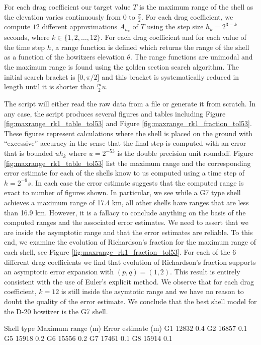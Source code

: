 \documentclass[runningheads]{llncs}
\begin{document}
For each drag coefficient our target value $T$ is the maximum range of the shell as the elevation varies continuously from $0$ to $\frac{\pi}{2}$. For each drag coefficient, we compute $12$ different approximations $A_{h_k}$ of $T$ using the step size $h_k = 2^{3-k}$ seconds, where $k \in \{1,2,\dots,12\}$.
For each drag coefficient and for each value of the time step $h$, a range function is defined which returns the range of the shell as a function of the howitzers elevation $\theta$.
The range functions are unimodal and the maximum range is found using the golden section search algorithm.
The initial search bracket is $[0,\pi/2$] and this bracket is systematically reduced in length until it is shorter than $\frac{pi}{2}u$.

The script will either read the raw data from a file or generate it from scratch. In any case, the script produces several figures and tables including Figure \ref{fig:maxrange_rk1_table_tol53} and Figure \ref{fig:maxrange_rk1_fraction_tol53}. These figures represent calculations where the shell is placed on the ground with ``excessive'' accuracy in the sense that the final step is computed with an error that is bounded $u h_{k}$ where $u = 2^{-53}$ is the double precision unit roundoff. Figure \ref{fig:maxrange_rk1_table_tol53} list the maximum range and the corresponding error estimate for each of the shells know to us computed using a time step of $h = 2^{-9} s$. In each case the error estimate suggests that the computed range is exact to number of figures shown. In particular, we see while a G7 type shell achieves a maximum range of 17.4 km, all other shells have ranges that are less than 16.9 km. However, it is a fallacy to conclude anything on the basis of the computed ranges and the associated error estimates. We need to assert that we are inside the asymptotic range and that the error estimates are reliable. To this end, we examine the evolution of Richardson's fraction for the maximum range of each shell, see Figure \ref{fig:maxrange_rk1_fraction_tol53}. For each of the 6 different drag coefficients we find that evolution of Richardson's fraction supports an asymptotic error expansion with $(p,q) = (1,2)$. This result is entirely consistent with the use of Euler's explicit method. We observe that for each drag coefficient, $k=12$ is still inside the asymtotic range and we have no reason to doubt the quality of the error estimate. We conclude that the best shell model for the D-20 howitzer is the G7 shell.

\begin{myverbbox}[\normalsize]{\vgamma}
Shell type  Maximum range (m) Error estimate (m)
    G1           12832                0.4 
    G2           16857                0.1 
    G5           15918                0.2 
    G6           15556                0.2 
    G7           17461                0.1 
    G8           15914                0.1 
\end{myverbbox}
\end{document}
